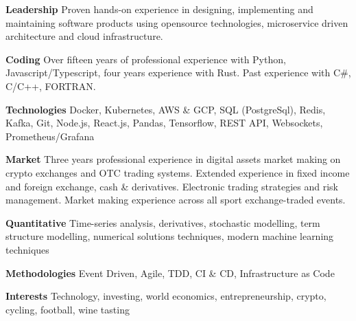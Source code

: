 {\bf Leadership} Proven hands-on experience in designing, implementing and maintaining software products
using opensource technologies, microservice driven architecture and cloud infrastructure.

{\bf Coding} Over fifteen years of professional experience with Python, Javascript/Typescript, four years experience with Rust.
Past experience with C\#, C/C++, FORTRAN.

{\bf Technologies} Docker, Kubernetes, AWS \& GCP, SQL (PostgreSql), Redis, Kafka, Git, Node.js, React.js, Pandas,
Tensorflow, REST API, Websockets, Prometheus/Grafana

{\bf Market} Three years professional experience in digital assets market making on crypto exchanges and OTC trading systems.
Extended experience in fixed income and foreign exchange, cash \& derivatives.
Electronic trading strategies and risk management.
Market making experience across all sport exchange-traded events.

{\bf Quantitative} Time-series analysis, derivatives, stochastic modelling, term structure modelling, numerical solutions techniques, modern machine learning techniques

{\bf Methodologies} Event Driven, Agile, TDD, CI \& CD, Infrastructure as Code

{\bf Interests} Technology, investing, world economics, entrepreneurship, crypto, cycling, football, wine tasting
